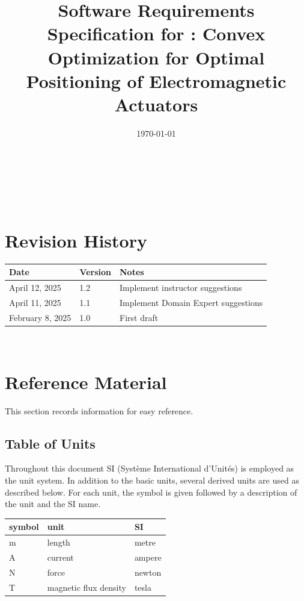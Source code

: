 \documentclass[12pt]{article}
\begin{document}
\title{Software Requirements Specification for \progname: Convex Optimization for Optimal Positioning of Electromagnetic Actuators} 
\author{\authname}
\date{\today}
	
\maketitle

~\newpage


\tableofcontents

~\newpage

\section*{Revision History}

\begin{tabularx}{\textwidth}{p{3cm}p{2cm}X}
\toprule {\bf Date} & {\bf Version} & {\bf Notes}\\
\midrule
April 12, 2025 & 1.2 & Implement instructor suggestions \\
\midrule
April 11, 2025 & 1.1 & Implement Domain Expert suggestions \\
\midrule
February 8, 2025 & 1.0 & First draft\\
\bottomrule
\end{tabularx}


~\newpage

\section{Reference Material}

This section records information for easy reference.

\subsection{Table of Units}

Throughout this document SI (Syst\`{e}me International d'Unit\'{e}s) is employed
as the unit system.  In addition to the basic units, several derived units are
used as described below.  For each unit, the symbol is given followed by a
description of the unit and the SI name.
~\newline

\renewcommand{\arraystretch}{1.2}
  \noindent \begin{tabular}{l l l} 
    \toprule		
    \textbf{symbol} & \textbf{unit} & \textbf{SI}\\
    \midrule 
    \si{\metre} & length & metre\\
    \si{\ampere} & current & ampere\\
    \si{\newton} & force & newton\\
    \si{\tesla} & magnetic flux density & tesla\\
    \bottomrule
  \end{tabular}
\end{document}
